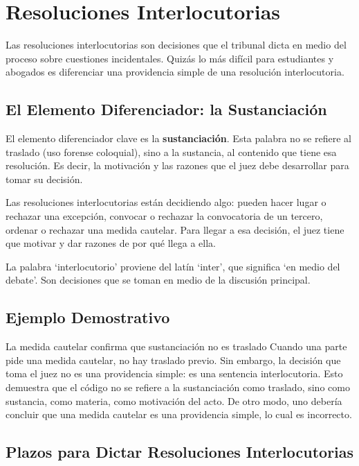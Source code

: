 \documentclass[12pt,oneside]{book}
\begin{document}
\section{Resoluciones Interlocutorias}

Las resoluciones interlocutorias son decisiones que el tribunal dicta en medio del proceso sobre cuestiones incidentales. Quizás lo más difícil para estudiantes y abogados es diferenciar una providencia simple de una resolución interlocutoria.

\subsection{El Elemento Diferenciador: la Sustanciación}

El elemento diferenciador clave es la \textbf{sustanciación}. Esta palabra no se refiere al traslado (uso forense coloquial), sino a la sustancia, al contenido que tiene esa resolución. Es decir, la motivación y las razones que el juez debe desarrollar para tomar su decisión.

Las resoluciones interlocutorias están decidiendo algo: pueden hacer lugar o rechazar una excepción, convocar o rechazar la convocatoria de un tercero, ordenar o rechazar una medida cautelar. Para llegar a esa decisión, el juez tiene que motivar y dar razones de por qué llega a ella.

\begin{note}
La palabra `interlocutorio' proviene del latín `inter', que significa `en medio del debate'. Son decisiones que se toman en medio de la discusión principal.
\end{note}

\subsection{Ejemplo Demostrativo}

\begin{example}{La medida cautelar confirma que sustanciación no es traslado}
Cuando una parte pide una medida cautelar, no hay traslado previo. Sin embargo, la decisión que toma el juez no es una providencia simple: es una sentencia interlocutoria. Esto demuestra que el código no se refiere a la sustanciación como traslado, sino como sustancia, como materia, como motivación del acto. De otro modo, uno debería concluir que una medida cautelar es una providencia simple, lo cual es incorrecto.
\end{example}

\subsection{Plazos para Dictar Resoluciones Interlocutorias}
\end{document}
